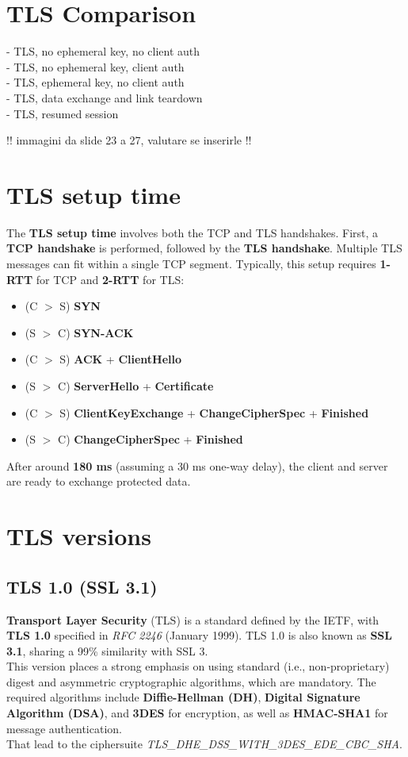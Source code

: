 \section{TLS Comparison}

- TLS, no ephemeral key, no client auth \\
- TLS, no ephemeral key,  client auth \\
- TLS, ephemeral key, no client auth \\
- TLS, data exchange and link teardown \\
- TLS, resumed session

!! immagini da slide 23 a 27, valutare se inserirle !!

\section{TLS setup time}

The \textbf{TLS setup time} involves both the TCP and TLS handshakes.
First, a \textbf{TCP handshake} is performed, followed by the \textbf{TLS handshake}.
Multiple TLS messages can fit within a single TCP segment. Typically, this setup requires
\textbf{1-RTT} for TCP and \textbf{2-RTT} for TLS:

\begin{itemize}[itemsep=0pt]
    \item (C $>$ S) \textbf{SYN}
    \item (S $>$ C) \textbf{SYN-ACK}
    \item (C $>$ S) \textbf{ACK} + \textbf{ClientHello}
    \item (S $>$ C) \textbf{ServerHello} + \textbf{Certificate}
    \item (C $>$ S) \textbf{ClientKeyExchange} + \textbf{ChangeCipherSpec} + \textbf{Finished}
    \item (S $>$ C) \textbf{ChangeCipherSpec} + \textbf{Finished}
\end{itemize}

After around \textbf{180 ms} (assuming a 30 ms one-way delay),
the client and server are ready to exchange protected data.

\section{TLS versions}

\subsection{TLS 1.0 (SSL 3.1)}
\textbf{Transport Layer Security} (TLS) is a standard defined by the IETF, with \textbf{TLS 1.0} specified in \textit{RFC 2246} (January 1999). TLS 1.0 is also known as \textbf{SSL 3.1}, sharing a 99\% similarity with SSL 3. \\
This version places a strong emphasis on using standard (i.e., non-proprietary) digest and asymmetric cryptographic algorithms, which are mandatory.
The required algorithms include \textbf{Diffie-Hellman (DH)}, \textbf{Digital Signature Algorithm (DSA)}, and \textbf{3DES} for encryption, as well as \textbf{HMAC-SHA1} for message authentication.\\ That lead to the ciphersuite \textit{TLS\_DHE\_DSS\_WITH\_3DES\_EDE\_CBC\_SHA}.

